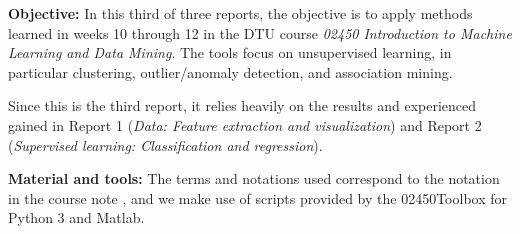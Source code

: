 \textbf{Objective:} In this third of three reports, the objective is to apply methods learned in weeks 10 through 12 in the DTU course \textit{02450 Introduction to Machine Learning and Data Mining}. The tools focus on unsupervised learning, in particular clustering, outlier/anomaly detection, and association mining. 

Since this is the third report, it relies heavily on the results and experienced gained in Report 1 (\textit{Data: Feature extraction and visualization}) and Report 2 (\textit{Supervised learning: Classification and regression}). 

\textbf{Material and tools:} The terms and notations used correspond to the notation in the course note \cite{coursenotes}, and we make use of scripts provided by the 02450Toolbox for Python 3 and Matlab.
